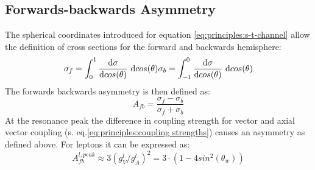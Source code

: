 \subsection{Forwards-backwards Asymmetry}
The spherical coordinates introduced for equation \ref{eq:principles:s-t-channel} allow the definition of cross sections for the forward and backwards hemisphere:
\begin{equation}
\sigma_f=\int_{0}^{1}\frac{\text{d}\sigma}{\text{d}cos(\theta)}~\text{d}cos(\theta) \\
\sigma_b=\int_{-1}^{0}\frac{\text{d}\sigma}{\text{d}cos(\theta)}~\text{d}cos(\theta)
\label{eq:priciples:fbintegral}
\end{equation}
The forwards backwards asymmetry is then defined as:
\begin{equation}
A_{fb}=\frac{\sigma_f-\sigma_b}{\sigma_f+\sigma_b}
\label{eq:principles:asymmetry definition}
\end{equation}
At the resonance peak the difference in coupling strength for vector and axial vector coupling (s. eq.\ref{eq:principles:coupling strengths}) causes an asymmetry as defined above. For leptons it can be expressed as:
\begin{equation}
A_{fb}^{l,peak}\approx 3 (g^l_V/g^l_A)^2=3\cdot (1-4 sin^2(\theta_w))
\label{eq:principles:asymmetry weinberg angle}
\end{equation}